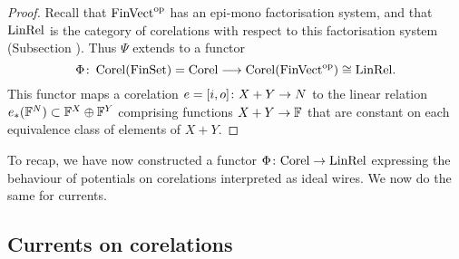 \begin{proof}
Recall that $\mathrm{FinVect}^{\mathrm{op}}$ has an epi-mono factorisation system, and that $\mathrm{LinRel}$
is the category of corelations with respect to this factorisation system
(Subsection ). Thus $\Psi$ extends to a functor 
\[
  \Phi{\colon} \operatorname{{Corel}}(\mathrm{FinSet}) = \mathrm{Corel} \longrightarrow
  \operatorname{{Corel}}(\mathrm{FinVect}^{\mathrm{op}}) \cong \mathrm{LinRel}.
\]
This functor maps a corelation $e= [i,o]{\colon} X+Y \to N$ to the linear relation
$e_\ast({\mathbb F}^N) \subset {\mathbb F}^X \oplus {\mathbb F}^Y$ comprising functions $X+Y \to {\mathbb F}$ that
are constant on each equivalence class of elements of $X+Y$.
\end{proof}

To recap, we have now constructed a functor $\Phi{\colon} \mathrm{Corel} \to
\mathrm{LinRel}$ expressing the behaviour of potentials on corelations interpreted
as ideal wires. We now do the same for currents.

\subsection{Currents on corelations}

